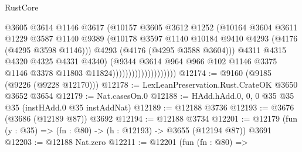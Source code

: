 \begin{lexlean}{RustCore}
\begin{coremodule}
                                          @3605
                                          @3614
                                          @1146
                                          @3617
                                          (@10157
                                            @3605
                                            @3612
                                            @1252
                                            (@10164
                                              @3604
                                              @3611
                                              @1229
                                              @3587
                                              @1140
                                              @9389
                                              (@10178
                                                @3597
                                                @1140
                                                @10184
                                                @9410
                                                @4293
                                                (@4176 (@4295 @3598 @1146)))
                                              @4293
                                              (@4176 (@4295 @3588 @3604)))
                                            @4311
                                            @4315
                                            @4320
                                            @4325
                                            @4331
                                            @4340)
                                          (@9344
                                            @3614
                                            @964
                                            @966
                                            @102
                                            @1146
                                            @3375
                                            @1146
                                            @3378
                                            @11803
                                            @11824))))))))))))))))))))
@12174 := @9160 (@9185 (@9226 (@9228 @12170)))
@12178 := LexLeanPreservation.Rust.CrateOK @3650 @3652 @3654
@12179 := Nat.casesOn.{0}
@12188 := HAdd.hAdd.{0, 0, 0} @35 @35 @35 (instHAdd.{0} @35 instAddNat)
@12189 := @12188 @3736
@12193 := @3676 (@3686 (@12189 @87)) @3692
@12194 := @12188 @3734
@12201 := @12179 (fun (y : @35) => (fn : @80) -> (h : @12193) -> @3655 (@12194 @87)) @3691
@12203 := @12188 Nat.zero
@12211 := @12201
    (fun (fn : @80) =>

\end{coremodule}
\end{lexlean}
